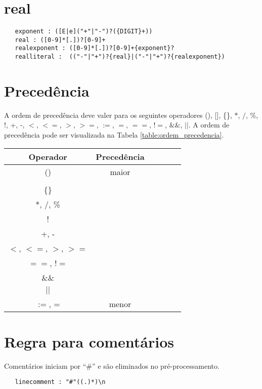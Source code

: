 \section{real}
\begin{verbatim}
   exponent : ([E|e]("+"|"-")?({DIGIT}+))
   real : ([0-9]*[.])?[0-9]+
   realexponent : ([0-9]*[.])?[0-9]+{exponent}?
   realliteral :  (("-"|"+")?{real}|("-"|"+")?{realexponent})
\end{verbatim}

\section{Precedência}
A ordem de precedência deve valer para os seguintes operadores (), [], \{\}, $*$, $/$, \%, !, +, -, $<$, $<=$, $>$, $>=$, $:=$, $=$, $==$, $!=$, $\&\&$, $||$. A ordem de precedência pode ser visualizada na Tabela \ref{table:ordem_precedencia}.

\begin{table*}[h]
\renewcommand{\arraystretch}{1.34}
\centering
\begin{tabular}{| c | c | c | c | c | c |}
\hline
\bfseries Operador & \bfseries Precedência  \\
\hline
() & maior \\ \hline
[] &  \\ \hline
\{\} &  \\ \hline
 *, /, \% & \\ \hline
  ! & \\ \hline
 +, - & \\ \hline
$<$, $<=$, $>$, $>=$ & \\ \hline
$==$, $!=$ & \\ \hline
\&\& & \\ \hline
$||$ & \\ \hline
$:=$, = & menor\\ \hline
\end{tabular}
\caption{Ordem de precedência para os operadores.}
\label{table:ordem_precedencia}
\end{table*}

\section{Regra para comentários}
    Comentários iniciam por ``\#'' e são eliminados no pré-processamento.
\begin{verbatim}
   linecomment : "#"((.)*)\n
\end{verbatim}
